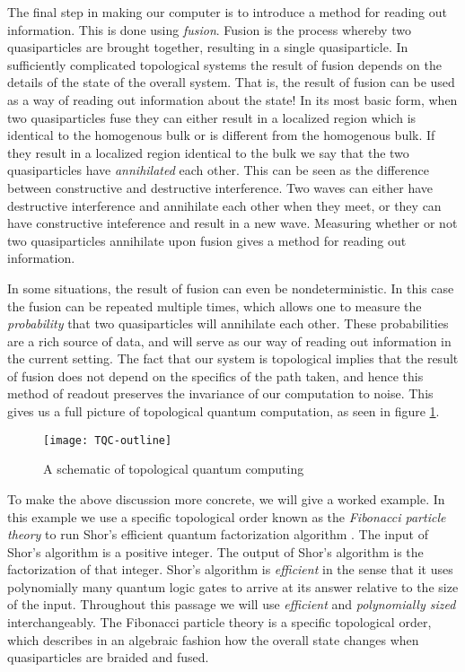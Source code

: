 The final step in making our computer is to introduce a method for reading out information. This is done using \textit{fusion}. Fusion is the process whereby two quasiparticles are brought together, resulting in a single quasiparticle. In sufficiently complicated topological systems the result of fusion depends on the details of the state of the overall system. That is, the result of fusion can be used as a way of reading out information about the state! In its most basic form, when two quasiparticles fuse they can either result in a localized region which is identical to the homogenous bulk or is different from the homogenous bulk. If they result in a localized region identical to the bulk we say that the two quasiparticles have \textit{annihilated} each other. This can be seen as the difference between constructive and destructive interference. Two waves can either have destructive interference and annihilate each other when they meet, or they can have constructive inteference and result in a new wave. Measuring whether or not two quasiparticles annihilate upon fusion gives a method for reading out information.

In some situations, the result of fusion can even be nondeterministic. In this case the fusion can be repeated multiple times, which allows one to measure the \textit{probability} that two quasiparticles will annihilate each other. These probabilities are a rich source of data, and will serve as our way of reading out information in the current setting. The fact that our system is topological implies that the result of fusion does not depend on the specifics of the path taken, and hence this method of readout preserves the invariance of our computation to noise. This gives us a full picture of topological quantum computation, as seen in figure \ref{fig:TQC-outline}.

\begin{figure}
\begin{center}
\texttt{[image: TQC-outline]}
\caption{A schematic of topological quantum computing}
\label{fig:TQC-outline}
\end{center}
\end{figure}

To make the above discussion more concrete, we will give a worked example. In this example we use a specific topological order known as the \textit{Fibonacci particle theory} to run Shor’s efficient quantum factorization algorithm \cite{shor1994algorithms}. The input of Shor’s algorithm is a positive integer. The output of Shor’s algorithm is the factorization of that integer. Shor’s algorithm is \textit{efficient} in the sense that it uses polynomially many quantum logic gates to arrive at its answer relative to the size of the input. Throughout this passage we will use \textit{efficient} and \textit{polynomially sized} interchangeably. The Fibonacci particle theory is a specific topological order, which describes in an algebraic fashion how the overall state changes when quasiparticles are braided and fused.

